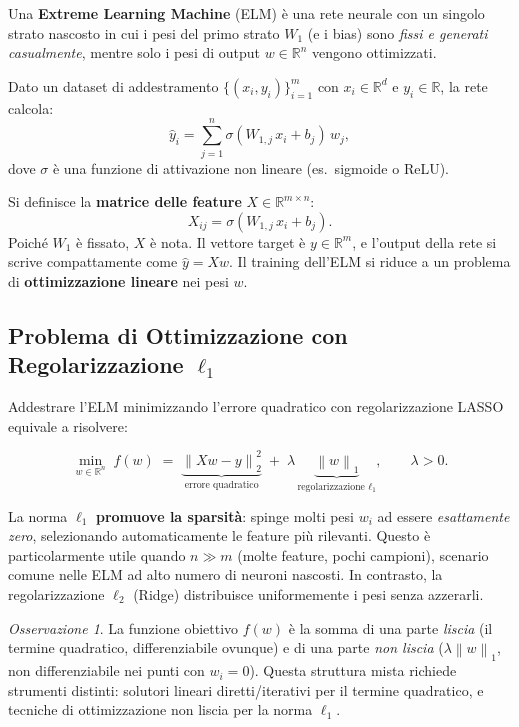 \documentclass[11pt,a4paper]{article}
\theoremstyle{definition}
\theoremstyle{plain}
\theoremstyle{remark}
\newtheorem{remark}{Osservazione}[section]
\newcommand{\R}{\mathbb{R}}
\newcommand{\norm}[1]{\left\| #1 \right\|}
\begin{document}
Una \textbf{Extreme Learning Machine} (ELM) è una rete neurale con un singolo strato nascosto
in cui i pesi del primo strato $W_1$ (e i bias) sono \emph{fissi e generati casualmente},
mentre solo i pesi di output $w \in \R^n$ vengono ottimizzati.

Dato un dataset di addestramento $\{(x_i, y_i)\}_{i=1}^m$ con $x_i \in \R^d$ e $y_i \in \R$,
la rete calcola:
\[
  \hat{y}_i = \sum_{j=1}^n \sigma(W_{1,j}\, x_i + b_j)\, w_j,
\]
dove $\sigma$ è una funzione di attivazione non lineare (es.\ sigmoide o ReLU).

\begin{keybox}
  Si definisce la \textbf{matrice delle feature} $X \in \R^{m \times n}$:
  \[
    X_{ij} = \sigma(W_{1,j}\, x_i + b_j).
  \]
  Poiché $W_1$ è fissato, $X$ è nota.
  Il vettore target è $y \in \R^m$, e l'output della rete si scrive compattamente come $\hat{y} = Xw$.
  Il training dell'ELM si riduce a un problema di \textbf{ottimizzazione lineare} nei pesi $w$.
\end{keybox}

\subsection{Problema di Ottimizzazione con Regolarizzazione $\ell_1$}

Addestrare l'ELM minimizzando l'errore quadratico con regolarizzazione LASSO equivale a risolvere:

\begin{keybox}
  \[
    \min_{w \in \R^n}\; f(w)
    \;=\; \underbrace{\norm{Xw - y}_2^2}_{\text{errore quadratico}}
    \;+\; \lambda\, \underbrace{\norm{w}_1}_{\text{regolarizzazione }\ell_1},
    \qquad \lambda > 0.
  \]
\end{keybox}

\begin{intubox}
  La norma $\ell_1$ \textbf{promuove la sparsità}: spinge molti pesi $w_i$ ad essere
  \emph{esattamente zero}, selezionando automaticamente le feature più rilevanti.
  Questo è particolarmente utile quando $n \gg m$ (molte feature, pochi campioni),
  scenario comune nelle ELM ad alto numero di neuroni nascosti.
  In contrasto, la regolarizzazione $\ell_2$ (Ridge) distribuisce uniformemente i pesi senza azzerarli.
\end{intubox}

\begin{remark}
  La funzione obiettivo $f(w)$ è la somma di una parte \emph{liscia} (il termine quadratico,
  differenziabile ovunque) e di una parte \emph{non liscia} ($\lambda\norm{w}_1$, non
  differenziabile nei punti con $w_i = 0$).
  Questa struttura mista richiede strumenti distinti: solutori lineari diretti/iterativi
  per il termine quadratico, e tecniche di ottimizzazione non liscia per la norma $\ell_1$.
\end{remark}
\end{document}
